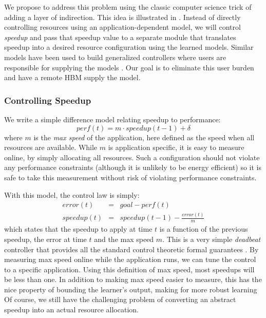 We propose to address this problem using the classic computer science
trick of adding a layer of indirection.  This idea is illustrated in
.  Instead of directly controlling resources using an
application-dependent model, we will control \emph{speedup} and pass
that speedup value to a separate module that translates speedup into a
desired resource configuration using the learned models.  Similar
models have been used to build generalized controllers where users are
responsible for supplying the models \cite{POET}.  Our goal is to
eliminate this user burden and have a remote HBM supply the model.

\subsubsection{Controlling Speedup}
We write a simple difference model relating speedup to performance:
\begin{equation}
  perf(t) = m \cdot speedup(t-1) + \delta \label{eqn:speedup}
\end{equation}
where $m$ is the \emph{max speed} of the application, here defined as
the speed when all resources are available.  While $m$ is application
specific, it is easy to measure online, by simply allocating all
resources. Such a configuration should not violate any performance
constraints (although it is unlikely to be energy efficient) so it is
safe to take this measurement without risk of violating performance
constraints.

With this model, the control law is simply:
\begin{eqnarray}
  error(t) &=& goal - perf(t) \label{eqn:speedup-error} \\
  speedup(t) &=& speedup(t-1) - \frac{error(t)}{m}
  \label{eqn:speedup-control}
\end{eqnarray}
which states that the speedup to apply at time $t$ is a function of
the previous speedup, the error at time $t$ and the max speed $m$.
This is a very simple \emph{deadbeat} controller that provides all the
standard control theoretic formal guarantees
\cite{seec-cdc2010,ICSE2014}.  By measuring max speed online while the
application runs, we can tune the control to a specific application.
Using this definition of max speed, most speedups will be less than
one.  In addition to making max speed easier to measure, this has the
nice property of bounding the learner's output, making for more robust
learning  Of course, we still have the challenging problem of
converting an abstract speedup into an actual resource allocation.


